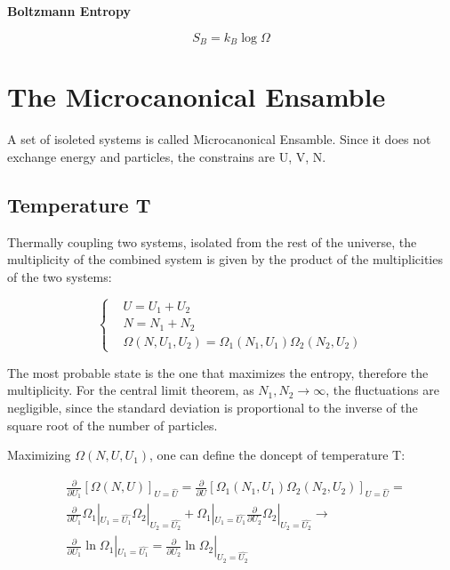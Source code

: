 \documentclass{article}
\begin{document}
\newpage

\begin{tcolorbox}[colframe=gray!90, colback=gray!5, coltitle=white, sharp corners, title=\textbf{Micro and Macrostates, Summary}, fonttitle=\large\bfseries]

    \textbf{Boltzmann Entropy}
    \vspace{0.5em}

    \begin{equation}
        S_B = k_B \log \Omega
    \end{equation}
\end{tcolorbox}

\newpage

\section{The Microcanonical Ensamble}
A set of isoleted systems is called Microcanonical Ensamble. Since it does not exchange energy and particles,
the constrains are U, V, N.

\subsection{Temperature T}
Thermally coupling two systems, isolated from the rest of the universe, the multiplicity of the combined system is given by the product of the multiplicities of the two systems:

\begin{equation}
    \left\{
    \begin{aligned}
         & U=U_1+U_2                                               \\
         & N=N_1+N_2                                               \\
         & \Omega(N,U_1,U_2) = \Omega_1(N_1,U_1) \Omega_2(N_2,U_2)
    \end{aligned}
    \right.
\end{equation}

The most probable state is the one that maximizes the entropy, therefore the multiplicity.
For the central limit theorem, as $N_1, N_2 \rightarrow \infty$, the fluctuations are negligible, since the standard deviation is proportional to the inverse of the square root of the number of particles.

Maximizing $\Omega(N, U, U_1)$, one can define the doncept of temperature T:

\begin{equation}
    \begin{aligned}
         & \frac{\partial}{\partial U_1}[\Omega(N, U)]_{U=\hat{U}} = \frac{\partial}{\partial U}[\Omega_1(N_1, U_1)\Omega_2(N_2, U_2)]_{U=\hat{U}} =                                     \\
         & \frac{\partial}{\partial U_1}\Omega_1|_{U_1=\hat{U_1}}\Omega_2|_{U_2=\hat{U_2}} + \Omega_1|_{U_1=\hat{U_1}}\frac{\partial}{\partial U_2}\Omega_2|_{U_2=\hat{U_2}} \rightarrow \\
         & \frac{\partial}{\partial U_1}\ln{\Omega_1}|_{U_1=\hat{U_1}}=\frac{\partial}{\partial U_2}\ln{\Omega_2}|_{U_2=\hat{U_2}}
    \end{aligned}
\end{equation}
\end{document}
